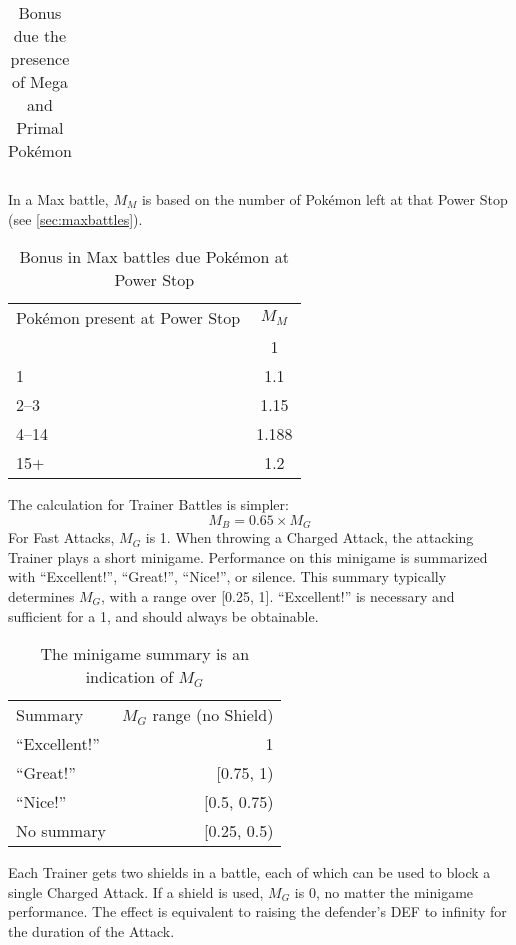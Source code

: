 \begin{itemize}
\begin{table}[h!]
\begin{center}
\begin{tabular}{p{}c}
       \end{tabular}
     \end{center}
     \caption{Bonus due the presence of Mega and Primal Pokémon}
   \end{table}
   In a Max battle, $M_M$ is based on the number of Pokémon left at that Power Stop
     (see \autoref{sec:maxbattles}).
   \begin{table}[h!]
     \begin{center}
       \begin{tabular}{lc}
         Pokémon present at Power Stop & $M_M$ \\
         \Midrule
         0 & 1 \\
         1 & 1.1 \\
         2--3 & 1.15 \\
         4--14 & 1.188 \\
         15+ & 1.2 \\
       \end{tabular}
     \end{center}
     \caption{Bonus in Max battles due Pokémon at Power Stop}
   \end{table}
\end{itemize}
The calculation for Trainer Battles is simpler:
\[ M_B = 0.65 \times M_G \]
For Fast Attacks, $M_G$ is 1.
When throwing a Charged Attack, the attacking Trainer plays a short minigame.
Performance on this minigame is summarized with ``Excellent!'', ``Great!'',
``Nice!'', or silence.
This summary typically determines $M_G$, with a range over [0.25, 1].
``Excellent!'' is necessary and sufficient for a 1, and should always be obtainable.
\begin{table}
  \begin{center}
    \begin{tabular}{l r}
      Summary & $M_G$ range (no Shield) \\
      \Midrule
      ``Excellent!'' & 1 \\
      ``Great!'' & [0.75, 1) \\
      ``Nice!'' & [0.5, 0.75) \\
      No summary & [0.25, 0.5) \\
  \end{tabular}
    \caption{The minigame summary is an indication of $M_G$}
  \end{center}
\end{table}
Each Trainer gets two shields in a battle, each of which can be used
 to block a single Charged Attack.
If a shield is used, $M_G$ is 0, no matter the minigame performance.
The effect is equivalent to raising the defender's DEF to infinity for the
  duration of the Attack.

